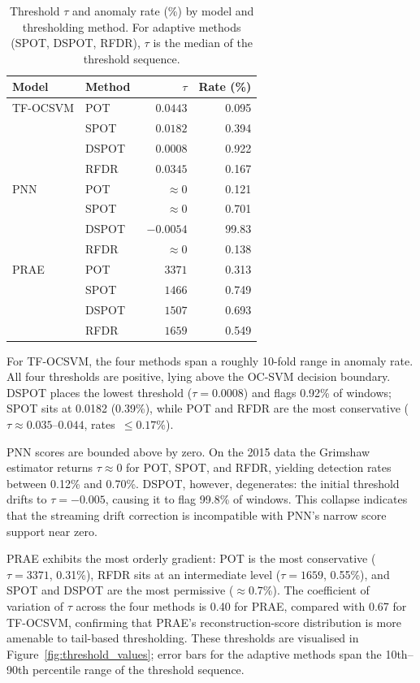 \documentclass[11pt]{report}
\begin{document}
\begin{table}[H]
\centering
\caption{Threshold $\tau$ and anomaly rate (\%) by model and thresholding method. For adaptive methods (SPOT, DSPOT, RFDR), $\tau$ is the median of the threshold sequence.}
\label{tab:threshold_levels}
\small
\begin{tabular}{llrr}
\toprule
Model & Method & $\tau$ & Rate (\%) \\
\midrule
TF-OCSVM & POT   & $\phantom{-}0.0443$ & 0.095 \\
            & SPOT  & $\phantom{-}0.0182$ & 0.394 \\
            & DSPOT & $\phantom{-}0.0008$ & 0.922 \\
            & RFDR  & $\phantom{-}0.0345$ & 0.167 \\
\midrule
PNN         & POT   & $\approx 0$\phantom{.0000} & 0.121 \\
            & SPOT  & $\approx 0$\phantom{.0000} & 0.701 \\
            & DSPOT & $-0.0054$  & 99.83 \\
            & RFDR  & $\approx 0$\phantom{.0000} & 0.138 \\
\midrule
PRAE        & POT   & $3371$\phantom{.00} & 0.313 \\
            & SPOT  & $1466$\phantom{.00} & 0.749 \\
            & DSPOT & $1507$\phantom{.00} & 0.693 \\
            & RFDR  & $1659$\phantom{.00} & 0.549 \\
\bottomrule
\end{tabular}
\end{table}

For TF-OCSVM, the four methods span a roughly 10-fold range in anomaly rate. All four thresholds are positive, lying above the OC-SVM decision boundary. DSPOT places the lowest threshold ($\tau = 0.0008$) and flags 0.92\% of windows; SPOT sits at 0.0182 (0.39\%), while POT and RFDR are the most conservative ($\tau \approx 0.035$--$0.044$, rates~$\leq 0.17$\%).

PNN scores are bounded above by zero. On the 2015 data the Grimshaw estimator returns $\tau \approx 0$ for POT, SPOT, and RFDR, yielding detection rates between 0.12\% and 0.70\%. DSPOT, however, degenerates: the initial threshold drifts to $\tau = -0.005$, causing it to flag 99.8\% of windows. This collapse indicates that the streaming drift correction is incompatible with PNN's narrow score support near zero.

PRAE exhibits the most orderly gradient: POT is the most conservative ($\tau = 3371$, 0.31\%), RFDR sits at an intermediate level ($\tau = 1659$, 0.55\%), and SPOT and DSPOT are the most permissive ($\approx 0.7$\%). The coefficient of variation of $\tau$ across the four methods is 0.40 for PRAE, compared with 0.67 for TF-OCSVM, confirming that PRAE's reconstruction-score distribution is more amenable to tail-based thresholding. These thresholds are visualised in Figure~\ref{fig:threshold_values}; error bars for the adaptive methods span the 10th--90th percentile range of the threshold sequence.
\end{document}
